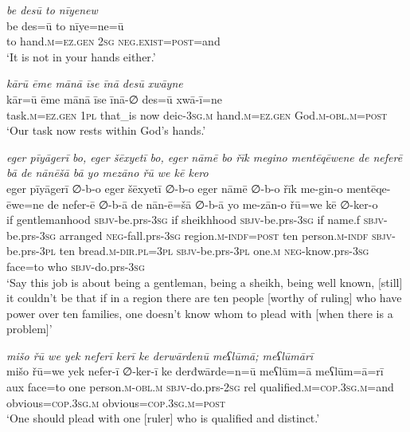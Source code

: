 \ea \label{ŠJ.87}
\textit{be desū to nīyenew} \\ 
\gll be des=ū to nīye=ne=ū \\ 
 to hand\textsc{.m}\textsc{=ez.gen} \textsc{2sg} \textsc{\textsc{neg.}exist}\textsc{=\textsc{post}}=and \\ 
\glt `It is not in your hands either.'
\z 
 
\ea \label{ŠJ.88}
\textit{kārū ēme mānā īse īnā desū xwāyne} \\ 
\gll kār=ū ēme mānā īse īnā-∅ des=ū xwā-ī=ne \\ 
 task\textsc{.m}\textsc{=ez.gen} \textsc{1pl} that\_is now deic\textsc{-3sg}\textsc{.m} hand\textsc{.m}\textsc{=ez.gen} God\textsc{.m}\textsc{-obl}\textsc{.m}\textsc{=\textsc{post}} \\ 
\glt `Our task now rests within God’s hands.'
\z 
 
\ea \label{ŠJ.91}
\textit{eger pīyāgerī bo, eger šēxyetī bo, eger nāmē bo řīk megino mentēqēwene de neferē bā de nānēšā bā yo mezāno řū we kē kero} \\ 
\gll eger pīyāgerī ∅-b-o eger šēxyetī ∅-b-o eger nāmē ∅-b-o řīk me-gin-o mentēqe-ēwe=ne de nefer-ē ∅-b-ā de nān-ē=šā ∅-b-ā yo me-zān-o řū=we kē ∅-ker-o \\ 
 if gentlemanhood \textsc{sbjv-}be.prs\textsc{-3sg} if sheikhhood \textsc{sbjv-}be.prs\textsc{-3sg} if name.f \textsc{sbjv-}be.prs\textsc{-3sg} arranged \textsc{neg-}fall.prs\textsc{-3sg} region\textsc{.m}\textsc{-indf}\textsc{=\textsc{post}} ten person\textsc{.m}\textsc{-indf} \textsc{sbjv-}be.prs\textsc{-3pl} ten bread\textsc{.m}\textsc{-dir}\textsc{.pl}\textsc{=3pl} \textsc{sbjv-}be.prs\textsc{-3pl} one\textsc{.m} \textsc{neg-}know.prs\textsc{-3sg} face=to who \textsc{sbjv-}do.prs\textsc{-3sg} \\ 
\glt `Say this job is about being a gentleman, being a sheikh, being well known, [still] it couldn’t be that if in a region there are ten people [worthy of ruling] who have power over ten families, one doesn’t know whom to plead with [when there is a problem]'
\z 
 
\ea \label{ŠJ.92}
\textit{mišo řū we yek neferī kerī ke derwārdenū meʕlūmā; meʕlūmārī} \\ 
\gll mišo řū=we yek nefer-ī ∅-ker-ī ke derđwārde=n=ū meʕlūm=ā meʕlūm=ā=rī \\ 
 aux face=to one person\textsc{.m}\textsc{-obl}\textsc{.m} \textsc{sbjv-}do.prs-\textsc{2sg} rel qualified\textsc{.m}\textsc{=cop}\textsc{.3sg}\textsc{.m}=and obvious\textsc{=cop}\textsc{.3sg}\textsc{.m} obvious\textsc{=cop}\textsc{.3sg}\textsc{.m}\textsc{=\textsc{post}} \\ 
\glt `One should plead with one [ruler] who is qualified and distinct.'
\z 
 
